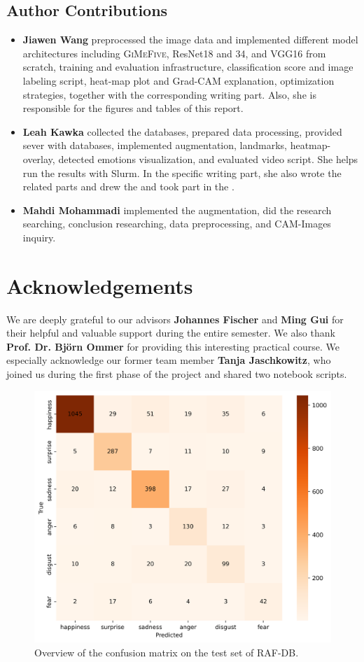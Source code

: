 \subsection*{Author Contributions}
\label{sec:author}

\begin{itemize}
  \item \textbf{Jiawen Wang} preprocessed the image data 
  and implemented different model architectures including \textsc{GiMeFive}, ResNet18 and 34, 
  and VGG16 from scratch, 
  training and evaluation infrastructure, classification score and image labeling script, 
  heat-map plot and Grad-CAM explanation, optimization strategies, 
  together with the corresponding writing part. 
  Also, she is responsible for the figures and tables of this report.
  \item \textbf{Leah Kawka} collected the databases, prepared data processing, provided sever with databases, 
  implemented augmentation, landmarks, heatmap-overlay, detected emotions visualization, 
  and evaluated video script. 
  She helps run the results with Slurm. 
  In the specific writing part, 
  she also wrote the related parts and drew the  and took part in the .
  \item \textbf{Mahdi Mohammadi} implemented the augmentation, did the research searching, conclusion researching, data preprocessing, and CAM-Images inquiry.
\end{itemize}

\section*{Acknowledgements}

We are deeply grateful to our advisors \textbf{Johannes Fischer} and \textbf{Ming Gui} for their helpful and valuable support during the entire semester. 
We also thank \textbf{Prof. Dr. Björn Ommer} for providing this interesting practical course. 
We especially acknowledge our former team member \textbf{Tanja Jaschkowitz}, 
who joined us during the first phase of the project and shared two notebook scripts.

\begin{figure}[ht]
  \centering
   \includegraphics[width=\linewidth]{mattest.png}
   \caption{Overview of the confusion matrix on the test set of RAF-DB.} 
   \label{fig:mattest}
\end{figure}